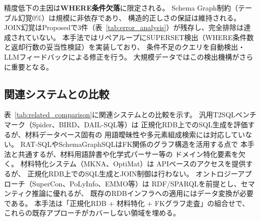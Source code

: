 \documentclass[5p,twocolumn]{elsarticle}
\begin{document}
精度低下の主因は\textbf{WHERE条件欠落}に限定される。
Schema Graph制約（テーブル幻覚0\%）は規模に非依存であり、
構造的正しさの保証は維持される。
JOIN幻覚はProposedで3件（表~\ref{tab:error_analysis}）が残存し、完全排除は達成されていない。
本手法ではリペアループにSUPERSET検出（WHERE条件数と返却行数の妥当性検証）を実装しており、
条件不足のクエリを自動検出・LLMフィードバックによる修正を行う。
大規模データではこの検出機構がさらに重要となる。

\subsection{関連システムとの比較}

表~\ref{tab:related_comparison}に関連システムとの比較を示す。
汎用T2SQLベンチマーク（Spider、BIRD、DAIL-SQL等）は
正規化RDB上でのSQL生成を評価するが、材料データベース固有の
用語曖昧性や多元素組成検索には対応していない。
RAT-SQLやSchemaGraphSQLはFK関係のグラフ構造を活用する点で
本手法と共通するが、材料用語辞書や化学式パーサー等の
ドメイン特化要素を欠く。
材料特化システム（MKNA、OptiMat）は
APIベースのアクセスを提供するが、
正規化RDB上でのSQL生成とJOIN制御は行わない。
オントロジーアプローチ（SuperCon、PoLyInfo、EMMO等）は
RDF/SPARQLを前提とし、セマンティク推論に優れるが、
既存のRDBインフラへの適用にはデータ変換が必要である。
本手法は「正規化RDB + 材料特化 + FKグラフ走査」の組合せで、
これらの既存アプローチがカバーしない領域を埋める。
\end{document}
